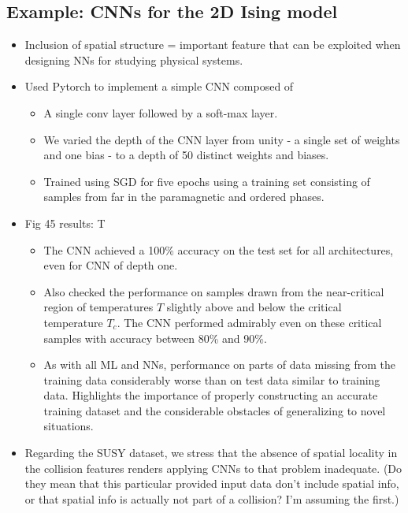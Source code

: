\documentclass[norsk,a4paper,11pt]{article}
\begin{document}
\subsection{Example: CNNs for the 2D Ising model}
\begin{itemize}
	\item Inclusion of spatial structure = important feature that can be exploited when designing NNs for studying physical systems.
	\item Used Pytorch to implement a simple CNN composed of 
	\begin{itemize}
		\item A single conv layer followed by a soft-max layer. 
		\item We varied the depth of the CNN layer from unity - a single set of weights and one bias - to a depth of 50 distinct weights and biases.
		\item Trained using SGD for five epochs using a training set consisting of samples from far in the paramagnetic and ordered phases. 
	\end{itemize}
	\item Fig 45 results: T
	\begin{itemize}
		\item The CNN achieved a 100\% accuracy on the test set for all architectures, even for CNN of depth one.
		\item Also checked the performance on samples drawn from the near-critical region of temperatures $T$ slightly above and below the critical temperature $T_c$. The CNN performed admirably even on these critical samples with accuracy between 80\% and 90\%. 
		\item As with all ML and NNs, performance on parts of data missing from the training data considerably worse than on test data similar to training data. Highlights the importance of properly constructing an accurate training dataset and the considerable obstacles of generalizing to novel situations. 
	\end{itemize}
	\item Regarding the SUSY dataset, we stress that the absence of spatial locality in the collision features renders applying CNNs to that problem inadequate. (Do they mean that this particular provided input data don't include spatial info, or that spatial info is actually not part of a collision? I'm assuming the first.)
\end{itemize}
\end{document}
